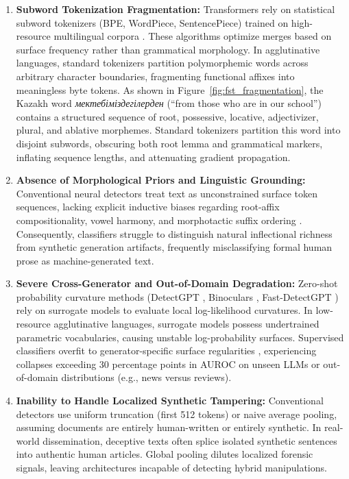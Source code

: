 \begin{enumerate}[leftmargin=*, label=(\arabic*), nosep]
    \item \textbf{Subword Tokenization Fragmentation:} Transformers rely on statistical subword tokenizers (BPE, WordPiece, SentencePiece) trained on high-resource multilingual corpora \cite{khurana2024subwords}. These algorithms optimize merges based on surface frequency rather than grammatical morphology. In agglutinative languages, standard tokenizers partition polymorphemic words across arbitrary character boundaries, fragmenting functional affixes into meaningless byte tokens. As shown in Figure~\ref{fig:fst_fragmentation}, the Kazakh word \textit{мектебіміздегілерден} (``from those who are in our school'') contains a structured sequence of root, possessive, locative, adjectivizer, plural, and ablative morphemes. Standard tokenizers partition this word into disjoint subwords, obscuring both root lemma and grammatical markers, inflating sequence lengths, and attenuating gradient propagation.
    
    \item \textbf{Absence of Morphological Priors and Linguistic Grounding:} Conventional neural detectors treat text as unconstrained surface token sequences, lacking explicit inductive biases regarding root-affix compositionality, vowel harmony, and morphotactic suffix ordering \cite{khoshhal2020kazakh, tyers2012free}. Consequently, classifiers struggle to distinguish natural inflectional richness from synthetic generation artifacts, frequently misclassifying formal human prose as machine-generated text.
    
    \item \textbf{Severe Cross-Generator and Out-of-Domain Degradation:} Zero-shot probability curvature methods (DetectGPT \cite{mitchell2023detectgpt}, Binoculars \cite{hans2024binoculars}, Fast-DetectGPT \cite{bao2024fastdetectgpt}) rely on surrogate models to evaluate local log-likelihood curvatures. In low-resource agglutinative languages, surrogate models possess undertrained parametric vocabularies, causing unstable log-probability surfaces. Supervised classifiers overfit to generator-specific surface regularities \cite{wang2024raid, khurana2023contrastive}, experiencing collapses exceeding 30 percentage points in AUROC on unseen LLMs or out-of-domain distributions (e.g., news versus reviews).
    
    \item \textbf{Inability to Handle Localized Synthetic Tampering:} Conventional detectors use uniform truncation (first 512 tokens) or naive average pooling, assuming documents are entirely human-written or entirely synthetic. In real-world dissemination, deceptive texts often splice isolated synthetic sentences into authentic human articles. Global pooling dilutes localized forensic signals, leaving architectures incapable of detecting hybrid manipulations.
\end{enumerate}

